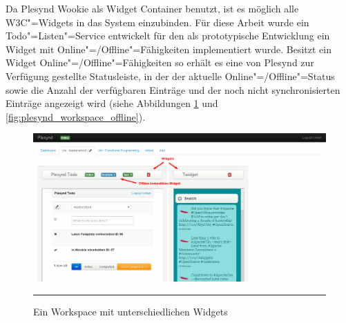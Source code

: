 Da Plesynd Wookie als Widget Container benutzt, ist es möglich alle W3C"=Widgets in das System einzubinden. Für diese Arbeit wurde ein Todo"=Listen"=Service entwickelt für den als prototypische Entwicklung ein Widget mit Online"=/Offline"=Fähigkeiten implementiert wurde. Besitzt ein Widget Online"=/Offline"=Fähigkeiten so erhält es eine von Plesynd zur Verfügung gestellte Statusleiste, in der der aktuelle Online"=/Offline"=Status sowie die Anzahl der verfügbaren Einträge und der noch nicht synchronisierten Einträge angezeigt wird (siehe Abbildungen \ref{fig:plesynd_workspace_online} und \ref{fig:plesynd_workspace_offline}).
\begin{figure}
  \centering
  \includegraphics[]{./Figures/plesynd_workspace_online.png}
    \rule{35em}{0.5pt}
  \caption[Plesynd User"=Interface: Workspace Online]{Ein Workspace mit unterschiedlichen Widgets}
  \label{fig:plesynd_workspace_online}
\end{figure}

